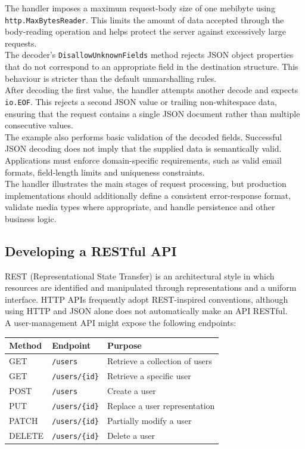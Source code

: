 The handler imposes a maximum request-body size of one mebibyte using \texttt{http.MaxBytesReader}. This limits the amount of data accepted through the body-reading operation and helps protect the server against excessively large requests.\\

The decoder's \texttt{DisallowUnknownFields} method rejects JSON object properties that do not correspond to an appropriate field in the destination structure. This behaviour is stricter than the default unmarshalling rules.\\

After decoding the first value, the handler attempts another decode and expects \texttt{io.EOF}. This rejects a second JSON value or trailing non-whitespace data, ensuring that the request contains a single JSON document rather than multiple consecutive values.\\

The example also performs basic validation of the decoded fields. Successful JSON decoding does not imply that the supplied data is semantically valid. Applications must enforce domain-specific requirements, such as valid email formats, field-length limits and uniqueness constraints.\\

The handler illustrates the main stages of request processing, but production implementations should additionally define a consistent error-response format, validate media types where appropriate, and handle persistence and other business logic.\\

\subsection{Developing a RESTful API}

REST (Representational State Transfer) is an architectural style in which resources are identified and manipulated through representations and a uniform interface. HTTP APIs frequently adopt REST-inspired conventions, although using HTTP and JSON alone does not automatically make an API RESTful.\\

A user-management API might expose the following endpoints:

\begin{center}
\begin{tabular}{|l|l|l|}
\hline
\textbf{Method} & \textbf{Endpoint} & \textbf{Purpose} \\
\hline
GET & \texttt{/users} & Retrieve a collection of users \\
GET & \texttt{/users/\{id\}} & Retrieve a specific user \\
POST & \texttt{/users} & Create a user \\
PUT & \texttt{/users/\{id\}} & Replace a user representation \\
PATCH & \texttt{/users/\{id\}} & Partially modify a user \\
DELETE & \texttt{/users/\{id\}} & Delete a user \\
\hline
\end{tabular}
\end{center}

